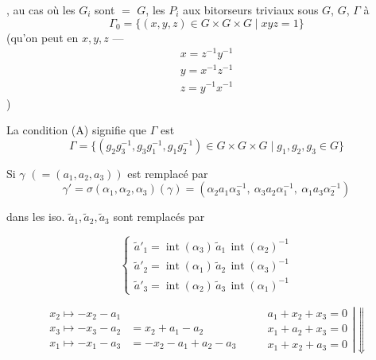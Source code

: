 \documentclass[11pt,a4paper]{article}
\begin{document}
 \ill{} \ill{},  \ill{} \ill{} au cas
où les $G_i$ sont $=$  $G$, les $P_i$ aux bitorseurs
triviaux sous $G$, $G$, $\Gamma$ à
\[
\Gamma_0 = \lbrace (x, y, z) \in G \times G \times G \mid xyz = 1 \rbrace
\]
(qu'on peut  en $x, y, z$ —
\[
\begin{array}{l}
x = z^{-1} y^{-1} \\
y = x^{-1} z^{-1} \\
z = y^{-1} x^{-1}
\end{array}
\]
)

La condition (A) signifie que $\Gamma$ est 
\struck{\ill{} \ill{}}
\[
\Gamma = \lbrace (g_2 g_3^{-1}, g_3 g_1^{-1}, g_1 g_2^{-1}) \in G \times G \times G \mid g_1, g_2, g_3 \in G \rbrace
\]

Si $\gamma$ $(= (a_1, a_2, a_3))$ est remplacé par
\[
\gamma' = \sigma(\alpha_1, \alpha_2, \alpha_3)(\gamma)
= (\alpha_2 a_1 \alpha_3^{-1},\ \alpha_3 a_2 \alpha_1^{-1},\ \alpha_1 a_3 \alpha_2^{-1})
\]

dans les iso. $\tilde a_1, \tilde a_2, \tilde a_3$ sont remplacés par

\[
\left\lbrace
\begin{array}{l}
\tilde a'_1 = \operatorname{int}(\alpha_3)\, \tilde a_1\, \operatorname{int}(\alpha_2)^{-1} \\
\tilde a'_2 = \operatorname{int}(\alpha_1)\, \tilde a_2\, \operatorname{int}(\alpha_3)^{-1} \\
\tilde a'_3 = \operatorname{int}(\alpha_2)\, \tilde a_3\, \operatorname{int}(\alpha_1)^{-1}
\end{array}
\right.
\]


\[
\begin{array}{ll}
x_2 \mapsto -x_2 - a_1 & \\
x_3 \mapsto -x_3 - a_2 & = x_2 + a_1 - a_2 \\
x_1 \mapsto -x_1 - a_3 & = -x_2 - a_1 + a_2 - a_3
\end{array}
\qquad
\left.
\begin{array}{l}
a_1 + x_2 + x_3 = 0 \\
x_1 + a_2 + x_3 = 0 \\
x_1 + x_2 + a_3 = 0
\end{array}
\right| \Downarrow
\]
\end{document}
